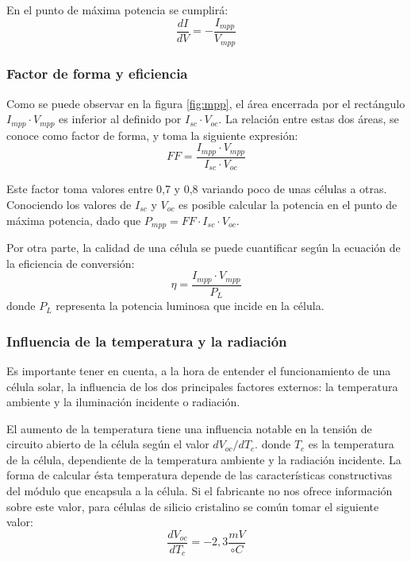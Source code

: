 En el punto de máxima potencia se cumplirá:
\begin{equation}
\frac{dI}{dV}=-\frac{I_{mpp}}{V_{mpp}}
\end{equation}
\subsubsection{Factor de forma y eficiencia}

Como se puede observar en la figura \ref{fig:mpp}, el área encerrada por el rectángulo $I_{mpp}\cdot V_{mpp}$ es inferior al definido por $I_{sc} \cdot V_{oc}$. La relación entre estas dos áreas, se conoce como factor de forma, y toma la siguiente expresión:
\begin{equation}
\label{eqn_FF}
FF = \frac{I_{mpp} \cdot V_{mpp}}{I_{sc} \cdot V_{oc}}
\end{equation}

Este factor toma valores entre 0,7 y 0,8 variando poco de unas células a otras. Conociendo los valores de $I_{sc}$ y $V_{oc}$ es posible calcular la potencia en el punto de máxima potencia, dado que $P_{mpp}=FF \cdot I_{sc} \cdot V_{oc}$.

Por otra parte, la calidad de una célula se puede cuantificar según la ecuación de la eficiencia de conversión:
\begin{equation}
\eta = \frac{I_{mpp} \cdot V_{mpp}}{P_L}
\end{equation}
donde $P_L$ representa la potencia luminosa que incide en la célula.

\subsubsection{Influencia de la temperatura y la radiación}

Es importante tener en cuenta, a la hora de entender el funcionamiento de una célula solar, la influencia de los dos principales factores externos: la temperatura ambiente y la iluminación incidente o radiación.

El aumento de la temperatura tiene una influencia notable en la tensión de circuito abierto de la célula según el valor $dV_{oc}/dT_c$. donde $T_c$ es la temperatura de la célula, dependiente de la temperatura ambiente y la radiación incidente. La forma de calcular ésta temperatura depende de las características constructivas del módulo que encapsula a la célula. Si el fabricante no nos ofrece información sobre este valor, para células de silicio cristalino se común tomar el siguiente valor:
\begin{equation}
\frac{dV_{oc}}{dT_c}=-2,3\frac{mV}{ \circ C}
\end{equation}

